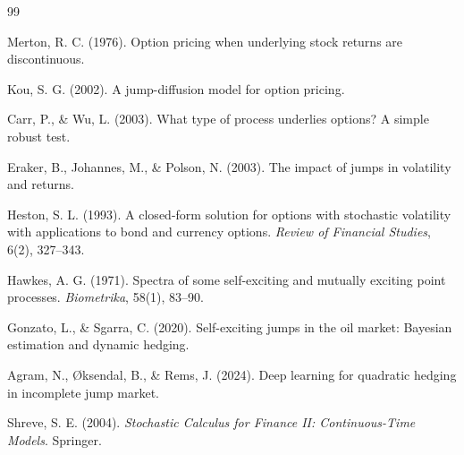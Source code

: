 \documentclass[12pt]{article}
\begin{document}
\begin{thebibliography}{99}

Merton, R. C. (1976).
Option pricing when underlying stock returns are discontinuous.

Kou, S. G. (2002).
A jump-diffusion model for option pricing.

Carr, P., \& Wu, L. (2003).
What type of process underlies options? A simple robust test.

Eraker, B., Johannes, M., \& Polson, N. (2003).
The impact of jumps in volatility and returns.

Heston, S. L. (1993).
A closed-form solution for options with stochastic volatility with applications to bond and currency options.
\textit{Review of Financial Studies}, 6(2), 327--343.

Hawkes, A. G. (1971).
Spectra of some self-exciting and mutually exciting point processes.
\textit{Biometrika}, 58(1), 83--90.

Gonzato, L., \& Sgarra, C. (2020).
Self-exciting jumps in the oil market: Bayesian estimation and dynamic hedging.

Agram, N., Øksendal, B., \& Rems, J. (2024).
Deep learning for quadratic hedging in incomplete jump market.


Shreve, S. E. (2004).
\textit{Stochastic Calculus for Finance II: Continuous-Time Models}.
Springer.

\end{thebibliography}
\end{document}
